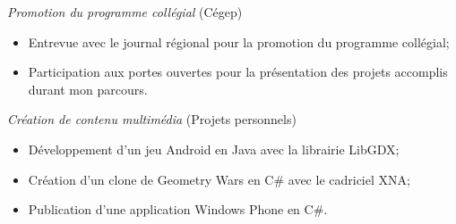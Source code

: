\documentclass{res}
\newcommand{\inEnglish}[1]{}
\begin{document}
\begin{resume}
{	{\sl Promotion du programme collégial} \hfill (Cégep)
	\vspace{0.05in}
	\begin{itemize} \itemsep -2pt
		\item Entrevue avec le journal régional pour la promotion du programme collégial;
		\item Participation aux portes ouvertes pour la présentation des projets accomplis durant mon parcours.
	\end{itemize}

	{\sl Création de contenu multimédia} \hfill (Projets personnels)
	\vspace{0.05in}
	\begin{itemize} \itemsep -2pt
		\item Développement d’un jeu Android en Java avec la librairie LibGDX;
		\item Création d’un clone de Geometry Wars en C\# avec le cadriciel XNA;
		\item Publication d’une application Windows Phone en C\#.
	\end{itemize}
}

\inEnglish{
	{\sl Member of Formule ÉTS (racing car club)} \hfill (Student club)
	\vspace{0.05in}
	\begin{itemize} \itemsep -2pt
		\item Creation of a vision document and a software requirements document for an application with reel-time telemetry.
		\item Prototyping of the application in JavaScript.
	\end{itemize}

	{\sl Member of Conjure (video game creation club)} \hfill (Student club)
	\vspace{0.05in}
	\begin{itemize} \itemsep -2pt
		\item Creation of a game in C\# with Unity.
		\item Project management.
	\end{itemize}

	{\sl Cegep involvement} \hfill (Cegep)
	\vspace{0.05in}
	\begin{itemize} \itemsep -2pt
		\item Interview with regional newspaper for the promotion of my course of study.
		\item Presentation of the projects I have done in school to promote my program of study during the college open day.
	\end{itemize}

}
\end{resume}
\end{document}
